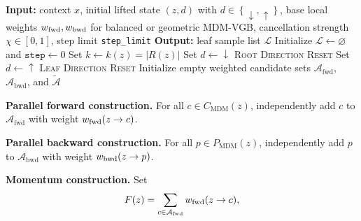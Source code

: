 \documentclass{article}
\numberwithin{theorem}{section}
\numberwithin{proposition}{section}
\numberwithin{corollary}{section}
\numberwithin{lemma}{section}
\numberwithin{conjecture}{section}
\numberwithin{remark}{section}
\numberwithin{definition}{section}
\numberwithin{assumption}{section}
\numberwithin{example}{section}
\newcommand{\mbra}[1]{\left\{#1\right\}}
\newcommand{\abs}[1]{\left| #1\right|}
\begin{document}
\begin{algorithm}[t]
\caption[Momentum MDM-VGB sampler]{Momentum MDM-VGB sampler
(\protect{} = parallelizable area;
\protect{} = momentum area)}
\label{alg:momentum_mdm_sampler}
\label{alg:momentum_mdm_transition}
\label{alg:momentum_balanced_mdm_transition}
\begin{algorithmic}[1]
\Statex \textbf{Input:} context $x$, initial lifted state $(z,d)$ with $d\in\mbra{\downarrow,\uparrow}$, base local weights $w_{\rm fwd},w_{\rm bwd}$ for balanced or geometric MDM-VGB, cancellation strength $\chi\in[0,1]$, step limit \texttt{step\_limit}
\Statex \textbf{Output:} leaf sample list $\mathcal L$
\State Initialize $\mathcal L\gets\varnothing$ and $\texttt{step}\gets0$
    \State Set $k\gets k(z)=\abs{R(z)}$
        \State Set $d\gets\downarrow$ \hfill \textsc{Root Direction Reset}
    \EndIf
        \State Set $d\gets\uparrow$ \hfill \textsc{Leaf Direction Reset}
    \EndIf
    \State Initialize empty weighted candidate sets $\mathcal A_{\mathrm{fwd}}$, $\mathcal A_{\mathrm{bwd}}$, and $\widetilde{\mathcal A}$
        \Statex \hspace*{\algorithmicindent}\colorbox{Lavender!25}{
        \parbox{0.88\linewidth}{
        \textbf{Parallel forward construction.}
        For all $c\in C_{\mathrm{MDM}}(z)$, independently add $c$ to
        $\mathcal A_{\mathrm{fwd}}$ with weight
        $w_{\rm fwd}(z\to c)$.}}
    \EndIf
        \Statex \hspace*{\algorithmicindent}\colorbox{Lavender!25}{
        \parbox{0.88\linewidth}{
        \textbf{Parallel backward construction.}
        For all $p\in P_{\mathrm{MDM}}(z)$, independently add $p$ to
        $\mathcal A_{\mathrm{bwd}}$ with weight
        $w_{\rm bwd}(z\to p)$.}}
    \EndIf
    \Statex \hspace*{\algorithmicindent}\colorbox{SkyBlue!15}{
    \parbox{0.88\linewidth}{
    \textbf{Momentum construction.}
    Set
    \begin{align*}
    \begin{aligned}
        F(z)&=\sum_{c\in\mathcal A_{\mathrm{fwd}}}w_{\rm fwd}(z\to c),\\

\end{aligned}
\end{align*}}}
\end{algorithmic}
\end{algorithm}
\end{document}
